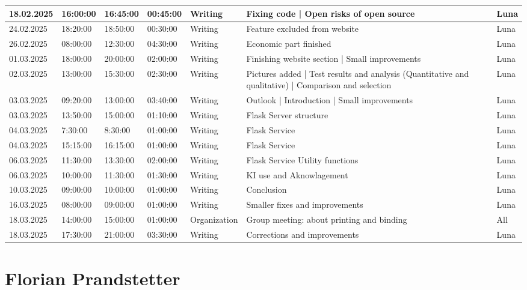 \begin{longtable}{@{}p{1.3cm} p{1cm} p{1cm} p{1cm} p{1.5cm} p{4.5cm} p{1.2cm}@{}}
\hline
18.02.2025 & 16:00:00 & 16:45:00 & 00:45:00 & Writing & Fixing code | Open risks of open source & Luna \\
\hline
24.02.2025 & 18:20:00 & 18:50:00 & 00:30:00 & Writing & Feature excluded from website & Luna \\
\hline
26.02.2025 & 08:00:00 & 12:30:00 & 04:30:00 & Writing & Economic part finished & Luna \\
\hline
01.03.2025 & 18:00:00 & 20:00:00 & 02:00:00 & Writing & Finishing website section | Small improvements & Luna \\
\hline
02.03.2025 & 13:00:00 & 15:30:00 & 02:30:00 & Writing & Pictures added | Test results and analysis (Quantitative and qualitative) | Comparison and selection & Luna \\
\hline
03.03.2025 & 09:20:00 & 13:00:00 & 03:40:00 & Writing & Outlook | Introduction | Small improvements & Luna \\
\hline
03.03.2025 & 13:50:00 & 15:00:00 & 01:10:00 & Writing & Flask Server structure & Luna \\
\hline
04.03.2025 & 7:30:00 & 8:30:00 & 01:00:00 & Writing & Flask Service & Luna \\
\hline
04.03.2025 & 15:15:00 & 16:15:00 & 01:00:00 & Writing & Flask Service & Luna \\
\hline
06.03.2025 & 11:30:00 & 13:30:00 & 02:00:00 & Writing & Flask Service Utility functions & Luna \\
\hline
06.03.2025 & 10:00:00 & 11:30:00 & 01:30:00 & Writing & KI use and Aknowlagement & Luna \\
\hline
10.03.2025 & 09:00:00 & 10:00:00 & 01:00:00 & Writing & Conclusion & Luna \\
\hline
16.03.2025 & 08:00:00 & 09:00:00 & 01:00:00 & Writing & Smaller fixes and improvements & Luna \\
\hline
18.03.2025 & 14:00:00 & 15:00:00 & 01:00:00 & Organization & Group meeting: about printing and binding & All \\
\hline
18.03.2025 & 17:30:00 & 21:00:00 & 03:30:00 & Writing & Corrections and improvements & Luna \\

\end{longtable}



\section{Florian Prandstetter}

